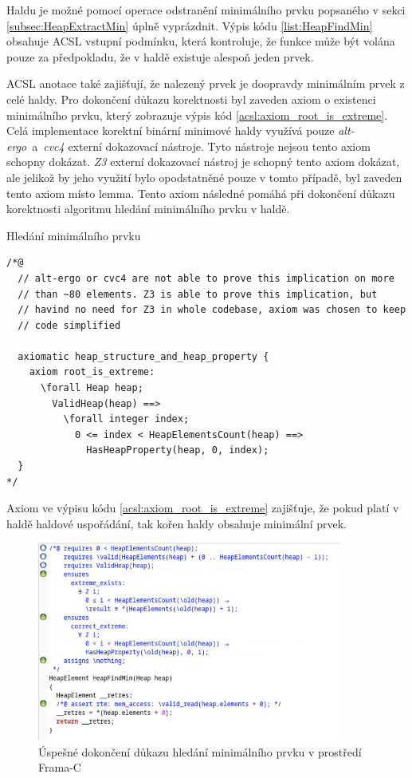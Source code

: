 Haldu je možné pomocí operace odstranění minimálního prvku popsaného v sekci \ref{subsec:HeapExtractMin} úplně vyprázdnit. Výpis kódu \ref{list:HeapFindMin} obsahuje ACSL vstupní podmínku, která kontroluje, že funkce může být volána pouze za předpokladu, že v haldě existuje alespoň jeden prvek.

ACSL anotace také zajišťují, že nalezený prvek je doopravdy minimálním prvek z celé haldy. Pro dokončení důkazu korektnosti byl zaveden axiom o existenci minimálního prvku, který zobrazuje výpis kód \ref{acsl:axiom_root_is_extreme}. Celá implementace korektní binární minimové haldy využívá pouze \textit{alt-ergo}~a~\textit{cvc4} externí dokazovací nástroje. Tyto nástroje nejsou tento axiom schopny dokázat. \textit{Z3} externí dokazovací nástroj je schopný tento axiom dokázat, ale jelikož by jeho využití bylo opodstatněné pouze v tomto případě, byl zaveden tento axiom místo lemma. Tento axiom následné pomáhá při dokončení důkazu korektnosti algoritmu hledání minimálního prvku v haldě.

\begin{listing}[H]
	\caption{Hledání minimálního prvku}
	\label{acsl:axiom_root_is_extreme}
	\begin{verbatim}
/*@
  // alt-ergo or cvc4 are not able to prove this implication on more
  // than ~80 elements. Z3 is able to prove this implication, but
  // havind no need for Z3 in whole codebase, axiom was chosen to keep
  // code simplified

  axiomatic heap_structure_and_heap_property {
    axiom root_is_extreme:
      \forall Heap heap;
        ValidHeap(heap) ==>
          \forall integer index;
            0 <= index < HeapElementsCount(heap) ==>
              HasHeapProperty(heap, 0, index);
  }
*/
	\end{verbatim}
\end{listing}

Axiom ve výpisu kódu \ref{acsl:axiom_root_is_extreme} zajišťuje, že pokud platí v haldě haldové uspořádání, tak kořen haldy obsahuje minimální prvek.

\begin{figure}[H]
	\centering
	\includegraphics[width=10cm]{images/frama-c-HeapFindMin}
	\caption{Úspešné dokončení důkazu hledání minimálního prvku v prostředí Frama-C}
	\label{img:F-C-HeapFindMin}
\end{figure}

